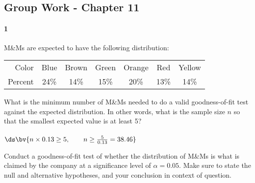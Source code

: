 \documentclass{article}
\begin{document}
\begin{flushleft}
\section*{Group Work - Chapter 11}
\paragraph{1} M\&Ms are expected to have the following distribution:\\
\smallskip
{\centering
\begin{tabular}{r | c c c c c c }
Color & Blue & Brown & Green & Orange & Red & Yellow\\
Percent & 24\% & 14\% & 15\% & 20\% & 13\% & 14\% 
\end{tabular}
\par} 
\begin{enumalpha}
\item What is the minimum number of M\&Ms needed to do a valid goodness-of-fit test against the expected distribution. In other words, what is the sample size $n$ so that the smallest expected value is at least 5?\\
\medskip
{}\\
\medskip
$\ds\bv{n \times 0.13 \ge 5, \qquad n \ge \frac 5 {0.13} = 38.46}$\\
\medskip
{}
\vspace{.5in}
\item Conduct a goodness-of-fit test of whether the distribution of M\&Ms is what is claimed by the company at a significance level of $\alpha=0.05$. Make sure to state the null and alternative hypotheses, and your conclusion in context of question.
\end{enumalpha}



\newpage

\end{flushleft}
\end{document}

